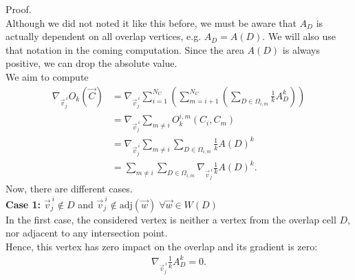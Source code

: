 \begin{proposition}
	Proof. \\
	Although we did not noted it like this before, we must be aware that $A_D$ is actually dependent on all overlap vertices, e.g. $A_D = A(D)$.
	We will also use that notation in the coming computation. 
	Since the area $A(D)$ is always positive, we can drop the absolute value. \\
	We aim to compute 
	\begin{align*}
		\nabla_{\vec{v}_j^{\: i}} O_k(\vec{C}) 
		&= \nabla_{\vec{v}_j^{\: i}} \sum\limits_{i=1}^{N_C} \left( \sum\limits_{m=i+1}^{N_C} \left(\sum\limits_{D \in \Omega_{i,m}} \frac{1}{k}A_{D}^k\right) \right) \\
		&= \nabla_{\vec{v}_j^{\: i}} \sum\limits_{m \neq i} O_k^{i,m}(C_i, C_m) \\
		&= \nabla_{\vec{v}_j^{\: i}} \sum\limits_{m \neq i} \sum\limits_{D \in \Omega_{i,m}} \frac{1}{k}A(D)^k \\
		&= \sum\limits_{m \neq i} \sum\limits_{D \in \Omega_{i,m}} \nabla_{\vec{v}_j^{\: i}} \frac{1}{k}A(D)^k. 
	\end{align*}
	Now, there are different cases. \\
	\textbf{Case 1:} $\vec{v}_j^{\: i} \notin D$ and $\vec{v}_j^{\: i} \notin \text{adj}(\vec{w}) \; \forall \vec{w} \in W(D)$\\
	In the first case, the considered vertex is neither a vertex from the overlap cell $D$, nor adjacent to any intersection point. \\
	Hence, this vertex has zero impact on the overlap and its gradient is zero:
	\begin{align*}
		\nabla_{\vec{v}_j^{\: i}} \frac{1}{k}A_{D}^k = 0.
	\end{align*}


\end{proposition}

